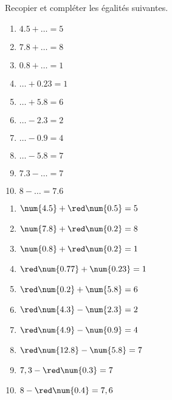 \begin{exercice*}
    Recopier et compléter les égalités suivantes.
    \begin{multicols}{2}
        \begin{spacing}{1.5}
            \begin{enumerate}
                \item $\num{4.5}+\dots =5$
                \item $\num{7.8}+\dots=8$
                \item $\num{0.8}+\dots=1$
                \item $\dots+\num{0.23}=1$
                \item $\dots+\num{5.8}=6$
                \item $\dots-\num{2.3} =2$
                \item $\dots-\num{0.9} =4$
                \item $\dots-\num{5.8} =7$
                \item $\num{7.3}-\dots =7$
                \item $8-\dots =\num{7.6}$
            \end{enumerate}
        \end{spacing}
    \end{multicols}
 \end{exercice*}
 \begin{corrige}
    \phantom{rrr}
    \begin{multicols}{2}
        \begin{enumerate}
            \item $\num{4.5}+{\red \num{0.5}} =5$
            \item $\num{7.8}+{\red \num{0.2}}=8$
            \item $\num{0.8}+{\red \num{0.2}}=1$
            \item ${\red\num{0.77}}+\num{0.23}=1$
            \item ${\red\num{0.2}}+\num{5.8}=6$
            \item ${\red\num{4.3}}-\num{2.3} =2$
            \item ${\red\num{4.9}}-\num{0.9} =4$
            \item ${\red\num{12.8}}-\num{5.8} =7$
            \item $7,3-{\red\num{0.3}} =7$
            \item $8-  {\red\num{0.4}} =7,6$
        \end{enumerate}
    \end{multicols}
 \end{corrige}